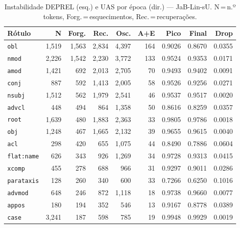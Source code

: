 

\begin{table}[ht]
\centering
\caption{Instabilidade DEPREL (esq.) e UAS por época (dir.) --- JaB-Lin-sU. N\,=\,n.º tokens, Forg.\,=\,esquecimentos, Rec.\,=\,recuperações.}
\label{tab:inst-modernJabuticaBERT-Base-1k-predictions-ablacao-linear}
\begin{minipage}[t]{0.54\linewidth}
\centering\tiny
\begin{tabular}{lrrrrrrrr}
\toprule
\textbf{Rótulo} & \textbf{N} & \textbf{Forg.} & \textbf{Rec.} & \textbf{Osc.} & \textbf{A+E} & \textbf{Pico} & \textbf{Final} & \textbf{Drop} \\
\midrule
\texttt{obl} & 1,519 & 1,563 & 2,834 & 4,397 & 164 & 0.9026 & 0.8670 & 0.0355 \\
\texttt{nmod} & 2,226 & 1,542 & 2,230 & 3,772 & 133 & 0.9524 & 0.9353 & 0.0171 \\
\texttt{amod} & 1,421 & 692 & 2,013 & 2,705 & 70 & 0.9493 & 0.9402 & 0.0091 \\
\texttt{conj} & 887 & 592 & 1,413 & 2,005 & 58 & 0.9526 & 0.9256 & 0.0271 \\
\texttt{nsubj} & 1,512 & 562 & 1,979 & 2,541 & 46 & 0.9537 & 0.9517 & 0.0020 \\
\texttt{advcl} & 448 & 494 & 864 & 1,358 & 50 & 0.8616 & 0.8259 & 0.0357 \\
\texttt{root} & 1,639 & 480 & 1,883 & 2,363 & 33 & 0.9805 & 0.9786 & 0.0018 \\
\texttt{obj} & 1,248 & 467 & 1,665 & 2,132 & 39 & 0.9655 & 0.9615 & 0.0040 \\
\texttt{acl} & 298 & 420 & 655 & 1,075 & 44 & 0.8490 & 0.7886 & 0.0604 \\
\texttt{flat\!:\!name} & 626 & 343 & 926 & 1,269 & 34 & 0.9728 & 0.9313 & 0.0415 \\
\texttt{xcomp} & 455 & 278 & 688 & 966 & 31 & 0.9297 & 0.9011 & 0.0286 \\
\texttt{parataxis} & 128 & 260 & 340 & 600 & 33 & 0.7266 & 0.6250 & 0.1016 \\
\texttt{advmod} & 648 & 246 & 872 & 1,118 & 18 & 0.9738 & 0.9660 & 0.0077 \\
\texttt{appos} & 180 & 194 & 352 & 546 & 13 & 0.9167 & 0.8778 & 0.0389 \\
\texttt{case} & 3,241 & 187 & 598 & 785 & 19 & 0.9948 & 0.9929 & 0.0019 \\
\bottomrule
\end{tabular}
\end{minipage}

\end{table}
